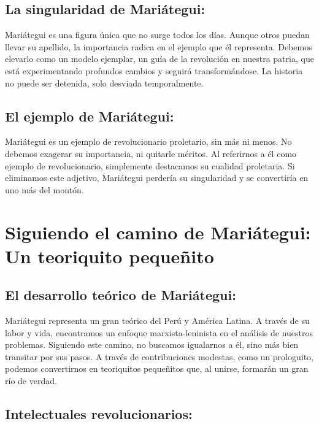 \documentclass[
  jou,
  floatsintext,
  longtable,
  a4paper,
  nolmodern,
  notxfonts,
  notimes,
  12pt,
  colorlinks=true,linkcolor=blue,citecolor=blue,urlcolor=blue]{apa7}
\begin{document}
\subsection{La singularidad de
Mariátegui:}\label{la-singularidad-de-mariuxe1tegui}

Mariátegui es una figura única que no surge todos los días. Aunque otros
puedan llevar su apellido, la importancia radica en el ejemplo que él
representa. Debemos elevarlo como un modelo ejemplar, un guía de la
revolución en nuestra patria, que está experimentando profundos cambios
y seguirá transformándose. La historia no puede ser detenida, solo
desviada temporalmente.

\subsection{El ejemplo de
Mariátegui:}\label{el-ejemplo-de-mariuxe1tegui}

Mariátegui es un ejemplo de revolucionario proletario, sin más ni menos.
No debemos exagerar su importancia, ni quitarle méritos. Al referirnos a
él como ejemplo de revolucionario, simplemente destacamos su cualidad
proletaria. Si eliminamos este adjetivo, Mariátegui perdería su
singularidad y se convertiría en uno más del montón.

\section{Siguiendo el camino de Mariátegui: Un teoriquito
pequeñito}\label{siguiendo-el-camino-de-mariuxe1tegui-un-teoriquito-pequeuxf1ito}

\subsection{El desarrollo teórico de
Mariátegui:}\label{el-desarrollo-teuxf3rico-de-mariuxe1tegui}

Mariátegui representa un gran teórico del Perú y América Latina. A
través de su labor y vida, encontramos un enfoque marxista-leninista en
el análisis de nuestros problemas. Siguiendo este camino, no buscamos
igualarnos a él, sino más bien transitar por sus pasos. A través de
contribuciones modestas, como un prologuito, podemos convertirnos en
teoriquitos pequeñitos que, al unirse, formarán un gran río de verdad.

\subsection{Intelectuales
revolucionarios:}\label{intelectuales-revolucionarios}
\end{document}
